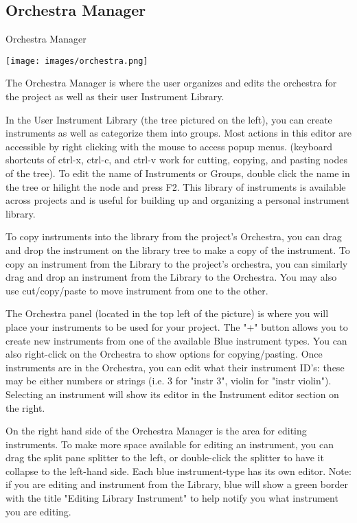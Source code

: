 \subsection{Orchestra Manager}\label{orchestraManager}

Orchestra Manager

\texttt{[image: images/orchestra.png]}

The Orchestra Manager is where the user organizes and edits the
orchestra for the project as well as their user Instrument Library.

In the User Instrument Library (the tree pictured on the left), you can
create instruments as well as categorize them into groups. Most actions
in this editor are accessible by right clicking with the mouse to access
popup menus. (keyboard shortcuts of ctrl-x, ctrl-c, and ctrl-v work for
cutting, copying, and pasting nodes of the tree). To edit the name of
Instruments or Groups, double click the name in the tree or hilight the
node and press F2. This library of instruments is available across
projects and is useful for building up and organizing a personal
instrument library.

To copy instruments into the library from the project's Orchestra, you
can drag and drop the instrument on the library tree to make a copy of
the instrument. To copy an instrument from the Library to the project's
orchestra, you can similarly drag and drop an instrument from the
Library to the Orchestra. You may also use cut/copy/paste to move
instrument from one to the other.

The Orchestra panel (located in the top left of the picture) is where
you will place your instruments to be used for your project. The "+"
button allows you to create new instruments from one of the available
Blue instrument types. You can also right-click on the Orchestra to show
options for copying/pasting. Once instruments are in the Orchestra, you
can edit what their instrument ID's: these may be either numbers or
strings (i.e. 3 for "instr 3", violin for "instr violin"). Selecting an
instrument will show its editor in the Instrument editor section on the
right.

On the right hand side of the Orchestra Manager is the area for editing
instruments. To make more space available for editing an instrument, you
can drag the split pane splitter to the left, or double-click the
splitter to have it collapse to the left-hand side. Each blue
instrument-type has its own editor. Note: if you are editing and
instrument from the Library, blue will show a green border with the
title "Editing Library Instrument" to help notify you what instrument
you are editing.

